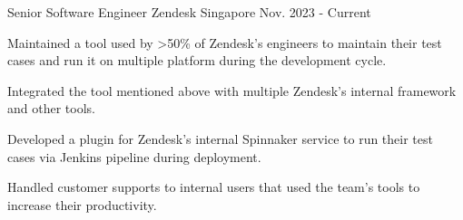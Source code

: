 

\begin{cventries}

  \cventry
    {Senior Software Engineer} %
    {Zendesk} %
    {Singapore} %
    {Nov. 2023 - Current} %
    {
      \begin{cvitems} %
        \item {Maintained a tool used by >50\% of Zendesk's engineers to maintain their test cases and run it on multiple platform during the development cycle.}
        \item {Integrated the tool mentioned above with multiple Zendesk's internal framework and other tools.}
        \item {Developed a plugin for Zendesk's internal Spinnaker service to run their test cases via Jenkins pipeline during deployment.}
        \item {Handled customer supports to internal users that used the team's tools to increase their productivity.}
      \end{cvitems}
    }


\end{cventries}
